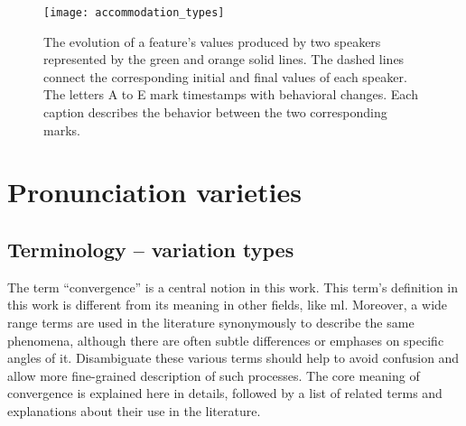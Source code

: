 \begin{figure}[t]
	\centering
	\texttt{[image: accommodation\_types]}
	\caption[Different accommodation types in a conversation]
		{The evolution of a feature's values produced by two speakers represented by the green and orange solid lines.
		The dashed lines connect the corresponding initial and final values of each speaker.
		The letters A to E mark timestamps with behavioral changes.
		Each caption describes the behavior between the two corresponding marks.}
	\label{fig:accommodation_types}
\end{figure}

\section{Pronunciation varieties}
\label{sec:pronunciation_varieties}


\subsection{Terminology -- variation types}
\label{subsec:variation_types}

The term \enquote{convergence} is a central notion in this work.
This term's definition in this work is different from its meaning in other fields, like \ac{ml}.
Moreover, a wide range terms are used in the literature synonymously to describe the same phenomena, although there are often subtle differences or emphases on specific angles of it.
Disambiguate these various terms should help to avoid confusion and allow more fine-grained description of such processes.
The core meaning of convergence is explained here in details, followed by a list of related terms and explanations about their use in the literature.

